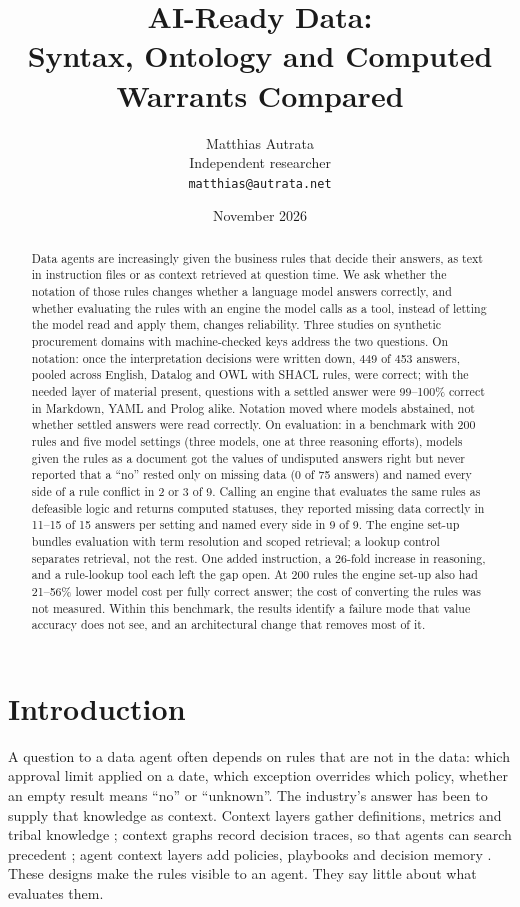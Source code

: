 \documentclass[11pt]{article}
\title{AI-Ready Data:\\Syntax, Ontology and Computed Warrants Compared}
\author{Matthias Autrata\\Independent researcher\\\texttt{matthias@autrata.net}}
\date{November 2026}
\begin{document}
\maketitle

\begin{abstract}
Data agents are increasingly given the business rules that decide their answers, as text in instruction files or
as context retrieved at question time. We ask whether the notation of those rules changes whether a language model
answers correctly, and whether evaluating the rules with an engine the model calls as a tool, instead of letting
the model read and apply them, changes reliability. Three studies on synthetic procurement domains with
machine-checked keys address the two questions. On notation: once the interpretation decisions were written down,
449 of 453 answers, pooled across English, Datalog and OWL with SHACL rules, were correct; with the needed layer of
material present, questions with a settled answer were 99--100\% correct in Markdown, YAML and Prolog alike.
Notation moved where models abstained, not whether settled answers were read correctly. On evaluation: in a
benchmark with 200 rules and five model settings (three models, one at three reasoning efforts), models given the
rules as a document got the values of undisputed answers right but never reported that a ``no'' rested only on
missing data (0 of 75 answers) and named every side of a rule conflict in 2 or 3 of 9. Calling an engine that evaluates the same rules as defeasible logic and returns computed statuses, they reported missing data correctly in 11--15 of 15 answers per setting and named every side in 9 of 9. The engine set-up bundles evaluation with term resolution and scoped retrieval; a lookup control separates retrieval, not the rest. One added instruction, a 26-fold increase in reasoning, and a rule-lookup
tool each left the gap open. At 200 rules the engine set-up also had 21--56\% lower model cost per fully correct
answer; the cost of converting the rules was not measured. Within this benchmark, the results identify a failure mode that value accuracy does not see, and an architectural change that removes most of it.
\end{abstract}

\section{Introduction}

A question to a data agent often depends on rules that are not in the data: which approval limit applied on a
date, which exception overrides which policy, whether an empty result means ``no'' or ``unknown''. The industry's
answer has been to supply that knowledge as context. Context layers gather definitions, metrics and tribal
knowledge \citep{cui2026context}; context graphs record decision traces, so that agents can search precedent
\citep{gupta2025context}; agent context layers add policies, playbooks and decision memory
\citep{klahr2026context}. These designs make the rules visible to an agent. They say little about what evaluates
them.
\end{document}
